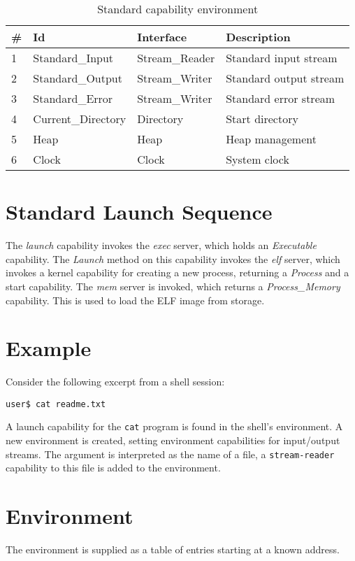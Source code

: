 \begin{table}[ht]
\begin{tabular}{l l l l}
\hline\hline
\# & Id & Interface & Description \\
\hline
1 & Standard\_Input & Stream\_Reader & Standard input stream \\
2 & Standard\_Output & Stream\_Writer & Standard output stream \\
3 & Standard\_Error & Stream\_Writer & Standard error stream \\
4 & Current\_Directory & Directory & Start directory \\
5 & Heap & Heap & Heap management \\
6 & Clock & Clock & System clock \\
\hline
\end{tabular}
\caption{Standard capability environment}
\label{table:standard-cap-env}
\end{table}

\section{Standard Launch Sequence}

The {\em launch} capability invokes the {\em exec} server, which holds an {\em Executable} capability.  
The {\em Launch} method on this capability invokes the {\em elf} server,
which invokes a kernel capability for creating a new process, returning a {\em Process} and a start capability.
The {\em mem} server is invoked, which returns a {\em Process\_Memory} capability.
This is used to load the ELF image from storage.

\section{Example}

Consider the following excerpt from a shell session:

{\tt user\$ cat readme.txt }

A launch capability for the {\tt cat} program is found in the shell's environment.  A new environment is created, setting environment capabilities for input/output streams.  The argument is interpreted as the name of a file, a {\tt stream-reader} capability to this file is added to the environment.

\section{Environment}

The environment is supplied as a table of entries starting at a known address.

